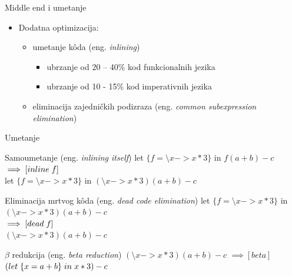 \documentclass{beamer}
\begin{document}
\begin{frame}{Middle end i umetanje}
	\begin{itemize}
		\item Dodatna optimizacija:
		\begin{itemize}
			\item  umetanje k\^{o}da (eng. \emph{inlining})
			\begin{itemize}
				\item ubrzanje  od 20 – 40\% kod funkcionalnih jezika
				\item ubrzanje od  10 - 15\% kod imperativnih jezika
			\end{itemize}
			\item  eliminacija zajedničkih podizraza (eng. \emph{common subexpression elimination})
		\end{itemize}
	\end{itemize}
\end{frame}

\begin{frame}[fragile]{Umetanje}
		\begin{block}{Samoumetanje (eng. \emph{inlining itself})}
			let $  \{f = \setminus x -> x*3 \} $ in $  f (a + b) - c $
			\\$ \implies [inline \hspace{1mm} f] $
			\\let $  \{f = \setminus x -> x*3 \}  $ in $ (\setminus x -> x*3) (a + b) - c $
		\end{block}
		\begin{block}{Eliminacija mrtvog k\^{o}da (eng. \emph{dead code elimination}) }
			let  $ \{f = \setminus x -> x*3 \} $ in $ (\setminus x -> x*3) (a + b) - c $
			\\$ \implies [dead \hspace{1mm} f] $
			\\$ (\setminus x -> x*3) (a + b) - c $
		\end{block}
		\begin{block}{$\beta$  redukcija (eng. \emph{beta reduction})}
		$ (\setminus x -> x*3) (a + b) - c $
		$ \implies [beta] $
		$ (let  \hspace{1mm}  \{ x = a+b \}  \hspace{1mm}  in  \hspace{1mm}  x*3) - c $
		\end{block}
\end{frame}
\end{document}
